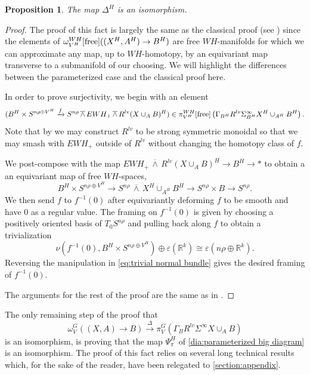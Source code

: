 \documentclass[11pt]{amsart}
\newcommand{\R}{\mathbb R}
\newcommand{\free}{\textup{free}}
\newcommand{\barsmash}{\,\overline\wedge\,}
\theoremstyle{plain}   %
\newtheorem{prop}[thm]{Proposition}
\theoremstyle{definition}
\theoremstyle{remark}
\numberwithin{equation}{section}
\begin{document}
\begin{prop}\label{prop:eq param fp PT iso}
The map $\Delta^H$ is an isomorphism.
\end{prop}
\begin{proof}
The proof of this fact is largely the same as the classical proof (see \cite{milnor_diff_top}) since the elements of $\omega_{V^H}^{WH}[\free]((X^H,A^H)\to B^H)$ are free $WH$-manifolds for which we can approximate any map, up to $WH$-homotopy, by an equivariant map transverse to a submanifold of our choosing. We will highlight the differences between the parameterized case and the classical proof here. 

In order to prove surjectivity, we begin with an element
\[
(B^H\times S^{n\rho\oplus V^H}\xrightarrow{f} S^{n\rho}\barsmash EWH_+\barsmash R^{lv}(X\cup_{A} B)^H)\in\pi_{V^H}^{WH}[\free]\left( \Gamma_{B^H} R^{lv}\Sigma^\infty_{B^H} X^H\cup_{A^H}B^H\right).
\] 
Note that by \cite{malkiewich_convenient} we may construct $R^{lv}$ to be strong symmetric monoidal so that we may smash with $EWH_+$ outside of $R^{lv}$ without changing the homotopy class of $f$. 

We post-compose with the map $EWH_+\barsmash R^{lv}(X\cup_{A}B)^H\to B^H\to *$ to obtain a an equivariant map of free $WH$-spaces,
\[
B^H\times S^{n\rho\oplus V^H}\to S^{n\rho}\barsmash X^H\cup_{A^H} B^H \to S^{n\rho}\times B \to S^{n\rho}.
\]
We then send $f$ to $f^{-1}(0)$ after equivariantly deforming $f$ to be smooth and have $0$ as a regular value. The framing on $f^{-1}(0)$ is given by choosing a positively oriented basis of $T_0 S^{n\rho}$ and pulling back along $f$ to obtain a trivialization
\[
\nu(f^{-1}(0),B^H\times S^{n\rho\oplus V^H})\oplus \varepsilon(\R^k)\cong \varepsilon(n\rho\oplus \R^k).
\]
Reversing the manipulation in \cref{eq:trivial normal bundle} gives the desired framing of $f^{-1}(0)$. 

The arguments for the rest of the proof are the same as in \cite{milnor_diff_top}.
\end{proof}

The only remaining step of the proof that
\[
\omega^G_{V}((X,A)\to B) \xrightarrow{\Delta} \pi_V^G(\Gamma_BR^{lv}\Sigma^\infty X\cup_A B)
\]
is an isomorphism, is proving that the map $\Psi_\pi^H$ of \cref{dia:parameterized big diagram} is an isomorphism. The proof of this fact relies on several long technical results which, for the sake of the reader, have been relegated to \cref{section:appendix}.
\end{document}
